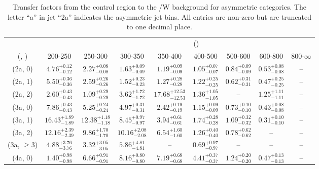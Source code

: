 \begin{table}[h!]
\tiny
\centering
\caption{Transfer factors from the \mmj control region to the \ttbar/W background for asymmetric categories. The letter ``a'' in jet \eg ``2a''  indicates the asymmetric jet bins. All entries are non-zero but are truncated to one decimal place.\label{tab:tf_mumu_ttw_asym}}
\begin{tabular}
{ccccccccc}
	\hline\hline
&	& \multicolumn{8}{c}{\scalht (\gev)} \\ 
	 (\njet,  \nb) & 200-250 & 250-300 & 300-350 & 350-400 & 400-500 & 500-600 & 600-800 & 800-$\infty$ \\ [0.8ex] 
\hline
	(2a, 0) & $4.76^{+ 0.12 }_{- 0.12 }$ & $2.27^{+ 0.08 }_{- 0.08 }$ & $1.63^{+ 0.09 }_{- 0.09 }$ & $1.19^{+ 0.09 }_{- 0.09 }$ & $1.05^{+ 0.07 }_{- 0.07 }$ & $0.84^{+ 0.09 }_{- 0.09 }$ & $0.53^{+ 0.08 }_{- 0.08 }$ & -- \\[0.5ex] 
	(2a, 1) & $5.50^{+ 0.36 }_{- 0.36 }$ & $2.59^{+ 0.26 }_{- 0.26 }$ & $1.52^{+ 0.23 }_{- 0.23 }$ & $1.27^{+ 0.28 }_{- 0.28 }$ & $1.22^{+ 0.25 }_{- 0.25 }$ & $0.62^{+ 0.31 }_{- 0.31 }$ & $0.47^{+ 0.25 }_{- 0.25 }$ & -- \\[0.5ex] 
	(2a, 2) & $2.60^{+ 0.43 }_{- 0.43 }$ & $1.09^{+ 0.29 }_{- 0.29 }$ & $3.62^{+ 1.72 }_{- 1.72 }$ & $17.68^{+ 12.53 }_{- 12.53 }$ & $1.36^{+ 1.05 }_{- 1.05 }$ & -- & $1.25^{+ 1.11 }_{- 1.11 }$ & -- \\[0.5ex] 
	(3a, 0) & $7.86^{+ 0.43 }_{- 0.43 }$ & $5.25^{+ 0.24 }_{- 0.24 }$ & $4.97^{+ 0.31 }_{- 0.31 }$ & $2.42^{+ 0.19 }_{- 0.19 }$ & $1.15^{+ 0.09 }_{- 0.09 }$ & $0.73^{+ 0.10 }_{- 0.10 }$ & $0.43^{+ 0.08 }_{- 0.08 }$ & -- \\[0.5ex] 
	(3a, 1) & $16.43^{+ 1.89 }_{- 1.89 }$ & $12.38^{+ 1.18 }_{- 1.18 }$ & $8.45^{+ 0.97 }_{- 0.97 }$ & $3.94^{+ 0.61 }_{- 0.61 }$ & $1.74^{+ 0.28 }_{- 0.28 }$ & $1.09^{+ 0.32 }_{- 0.32 }$ & $0.31^{+ 0.10 }_{- 0.10 }$ & -- \\[0.5ex] 
	(3a, 2) & $12.16^{+ 2.39 }_{- 2.39 }$ & $9.86^{+ 1.70 }_{- 1.70 }$ & $10.16^{+ 2.08 }_{- 2.08 }$ & $6.54^{+ 1.60 }_{- 1.60 }$ & $1.26^{+ 0.40 }_{- 0.40 }$ & $0.78^{+ 0.62 }_{- 0.62 }$ & -- & -- \\[0.5ex] 
	(3a, $\ge3$) & $4.88^{+ 3.76 }_{- 3.76 }$ & $3.32^{+ 3.05 }_{- 3.05 }$ & $5.86^{+ 4.81 }_{- 4.81 }$ & -- & $0.69^{+ 0.97 }_{- 0.97 }$ & -- & -- & -- \\[0.5ex] 
	(4a, 0) & $1.40^{+ 0.98 }_{- 0.98 }$ & $6.66^{+ 0.91 }_{- 0.91 }$ & $8.16^{+ 0.80 }_{- 0.80 }$ & $7.19^{+ 0.68 }_{- 0.68 }$ & $4.41^{+ 0.37 }_{- 0.37 }$ & $1.24^{+ 0.20 }_{- 0.20 }$ & $0.47^{+ 0.13 }_{- 0.13 }$ & -- \\[0.5ex] 

\end{tabular}
\end{table}
